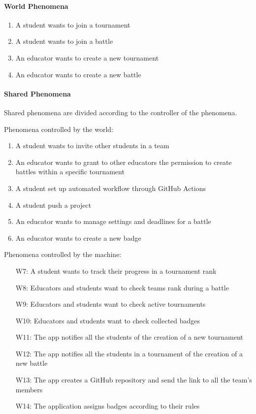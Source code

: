 \documentclass[a4paper, 11pt, titlepage]{article}
\begin{document}
\paragraph{World Phenomena}
\begin{enumerate}[label=W\arabic*:, align=left, leftmargin=*]
    \item A student wants to join a tournament
    \item A student wants to join a battle  
    \item An educator wants to create a new tournament 
    \item An educator wants to create a new battle
\end{enumerate}

\paragraph*{Shared Phenomena}
Shared phenomena are divided according to the controller of the phenomena.

Phenomena controlled by the world:
\begin{enumerate}[label=W\arabic*:, align=left, leftmargin=*]
    \item A student wants to invite other students in a team
    \item An educator wants to grant to other educators the permission to create battles within a specific tournament
    \item A student set up automated workflow through GitHub Actions
    \item A student push a project
    \item An educator wants to manage settings and deadlines for a battle
    \item An educator wants to create a new badge
\end{enumerate}

Phenomena controlled by the machine:
\begin{enumerate}[align=left, leftmargin=*]
    \item [W7:] A student wants to track their progress in a tournament rank
    \item [W8:] Educators and students want to check teams rank during a battle
    \item [W9:] Educators and students want to check active tournaments
    \item [W10:] Educators and students want to check collected badges
    \item [W11:] The app notifies all the students of the creation of a new tournament
    \item [W12:] The app notifies all the students in a tournament of the creation of a new battle
    \item [W13:] The app creates a GitHub repository and send the link to all the team's members
    \item [W14:] The application assigns badges according to their rules
\end{enumerate}
\end{document}
